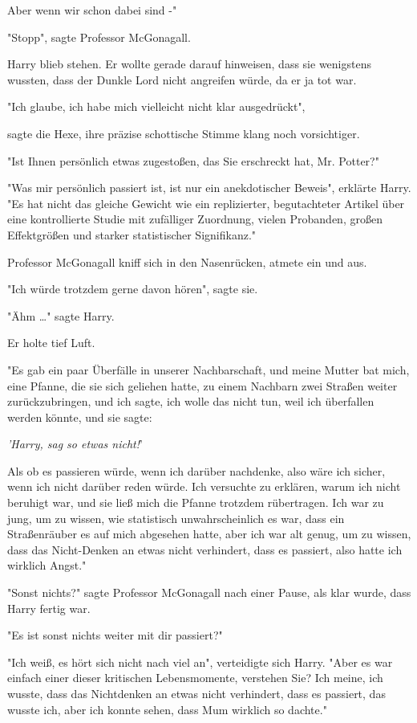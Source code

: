 {Aber wenn wir schon dabei sind -"

"Stopp", sagte Professor McGonagall.

Harry blieb stehen. Er wollte gerade darauf hinweisen, dass sie wenigstens wussten, dass der Dunkle Lord nicht angreifen würde, da er ja tot war.

"Ich glaube, ich habe mich vielleicht nicht klar ausgedrückt",

sagte die Hexe, ihre präzise schottische Stimme klang noch vorsichtiger.

"Ist Ihnen persönlich etwas zugestoßen, das Sie erschreckt hat, Mr. Potter?"

"Was mir persönlich passiert ist, ist nur ein anekdotischer Beweis", erklärte Harry. "Es hat nicht das gleiche Gewicht wie ein replizierter, begutachteter Artikel über eine kontrollierte Studie mit zufälliger Zuordnung, vielen Probanden, großen Effektgrößen und starker statistischer Signifikanz."

Professor McGonagall kniff sich in den Nasenrücken, atmete ein und aus.

"Ich würde trotzdem gerne davon hören", sagte sie.

"Ähm …" sagte Harry.

Er holte tief Luft.

"Es gab ein paar Überfälle in unserer Nachbarschaft, und meine Mutter bat mich, eine Pfanne, die sie sich geliehen hatte, zu einem Nachbarn zwei Straßen weiter zurückzubringen, und ich sagte, ich wolle das nicht tun, weil ich überfallen werden könnte, und sie sagte:

\emph{'Harry, sag so etwas nicht!}'

Als ob es passieren würde, wenn ich darüber nachdenke, also wäre ich sicher, wenn ich nicht darüber reden würde. Ich versuchte zu erklären, warum ich nicht beruhigt war, und sie ließ mich die Pfanne trotzdem rübertragen. Ich war zu jung, um zu wissen, wie statistisch unwahrscheinlich es war, dass ein Straßenräuber es auf mich abgesehen hatte, aber ich war alt genug, um zu wissen, dass das Nicht-Denken an etwas nicht verhindert, dass es passiert, also hatte ich wirklich Angst."

"Sonst nichts?" sagte Professor McGonagall nach einer Pause, als klar wurde, dass Harry fertig war.

"Es ist sonst nichts weiter mit dir passiert?"

"Ich weiß, es hört sich nicht nach viel an", verteidigte sich Harry. "Aber es war einfach einer dieser kritischen Lebensmomente, verstehen Sie? Ich meine, ich wusste, dass das Nichtdenken an etwas nicht verhindert, dass es passiert, das wusste ich, aber ich konnte sehen, dass Mum wirklich so dachte."

}
